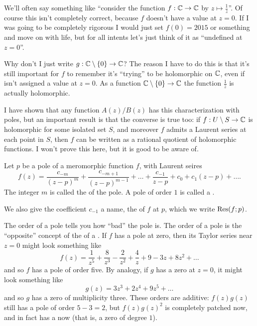 \begin{abuse}
	We'll often say something like ``consider the function $f : \mathbb C \to \mathbb C$ by $z \mapsto \frac 1z$''.
	Of course this isn't completely correct, because $f$ doesn't have a value at $z=0$.
	If I was going to be completely rigorous I would just set $f(0) = 2015$ or something and move on
	with life, but for all intents let's just think of it as ``undefined at $z=0$''.

	Why don't I just write $g : \mathbb C \setminus \{0\} \to \mathbb C$?
	The reason I have to do this is that it's still important 
	for $f$ to remember it's ``trying'' to be holomorphic on $\mathbb C$,
	even if isn't assigned a value at $z=0$.
	As a function $\mathbb C \setminus \{0\} \to \mathbb C$ the function $\frac 1z$ is actually holomorphic.
\end{abuse}

\begin{remark}
	I have shown that any function $A(z)/B(z)$
	has this characterization with poles,
	but an important result is
	that the converse is true too:
	if $f : U \setminus S \to \mathbb C$ is holomorphic for some isolated set $S$,
	and moreover $f$ admits a Laurent series at each point in $S$,
	then $f$ can be written as a rational quotient of holomorphic functions.
	I won't prove this here, but it is good to be aware of.
\end{remark}

\begin{definition}
	Let $p$ be a pole of a meromorphic function $f$, with Laurent seires
	\[ 
		f(z) =
		\frac{c_{-m}}{(z-p)^m}
		+ \frac{c_{-m+1}}{(z-p)^{m-1}}
		+ \dots
		+ \frac{c_{-1}}{z-p} + c_0 + c_1 (z-p) + \dots.
	\]
	The integer $m$ is called the  of the pole.
	A pole of order $1$ is called a .
	
	We also give the coefficient $c_{-1}$ a name, the  of $f$ at $p$,
	which we write $\operatorname{Res}(f;p)$.
\end{definition}

The order of a pole tells you how ``bad'' the pole is.
The order of a pole is the ``opposite'' concept of the  of a .
If $f$ has a pole at zero, then its Taylor series near $z=0$ might look something like
\[ f(z) = \frac{1}{z^5} + \frac{8}{z^3} - \frac{2}{z^2} + \frac{4}{z} + 9 - 3z + 8z^2 + \dots \]
and so $f$ has a pole of order five.
By analogy, if $g$ has a zero at $z=0$, it might look something like
\[ g(z) = 3z^3 + 2z^4 + 9z^5 + \dots \]
and so $g$ has a zero of multiplicity three.
These orders are additive: $f(z) g(z)$ still has a pole of order $5-3=2$,
but $f(z)g(z)^2$ is completely patched now, and in fact has a  now
(that is, a zero of degree $1$).

